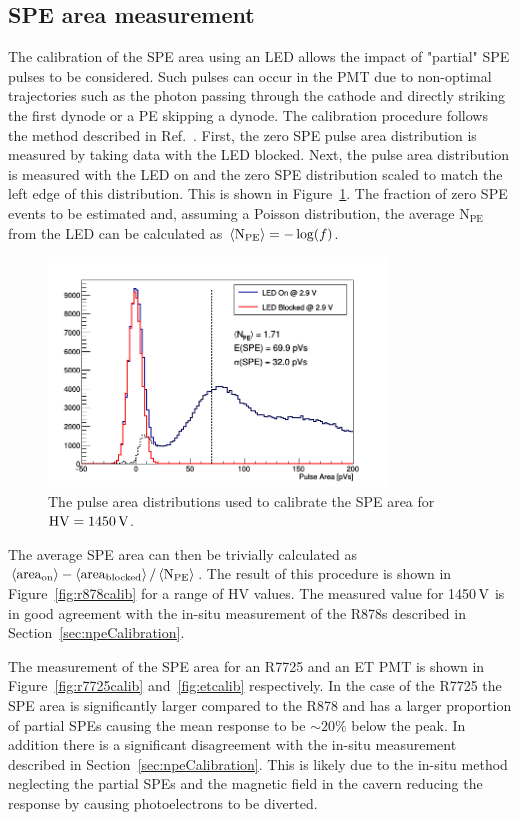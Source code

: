 \documentclass[12pt]{article}
\newcommand{\unit}[1]{\ensuremath{\text{\,#1}}\xspace}
\newcommand{\npe} {\mbox{\ensuremath{\textrm{N}_\textrm{PE}}}\xspace}
\begin{document}
\subsection{SPE area measurement}
\label{sec:ledarea}
The calibration of the SPE area using an LED allows the impact of "partial" SPE pulses to be considered.
Such pulses can occur in the PMT due to non-optimal trajectories such as the photon passing through the cathode and directly
striking the first dynode or a PE skipping a dynode. The calibration procedure follows the method described
in Ref.~\cite{Saldanha:2016mkn}. First, the zero SPE pulse area distribution is measured by taking data with the LED blocked.
Next, the pulse area distribution is measured with the LED on and the zero SPE distribution scaled to match the left edge of 
this distribution. This is shown in Figure~\ref{fig:SPEcalib}. The fraction of zero SPE events to be estimated and, assuming 
a Poisson distribution, the average \npe from the LED can be calculated as $\left< \npe \right> = -\log(f)$.

\begin{figure}[ht!]
    \centering
    \includegraphics[width=0.8\textwidth]{figures/speCalib}
    \caption{\label{fig:SPEcalib} The pulse area distributions used to calibrate the SPE area for
    $\text{HV}=1450\unit{V}$.}
\end{figure}

The average SPE area can then be trivially calculated as 
$\left<\text{area}_\text{on}\right>-\left<\text{area}_\text{blocked}\right>/\left<\npe\right>$.
The result of this procedure is shown in Figure~\ref{fig:r878calib} for a range of HV values. 
The measured value for 1450\unit{V} is in good agreement with the 
in-situ measurement of the R878s described in Section~\ref{sec:npeCalibration}.

The measurement of the SPE area for an R7725 and an ET PMT 
is shown in Figure~\ref{fig:r7725calib} and~\ref{fig:etcalib} respectively.
In the case of the R7725 the SPE area is significantly larger compared to the R878 and
has a larger proportion of partial SPEs causing the mean response to be $\sim 20\%$ below the peak.
In addition there is a significant disagreement with the in-situ measurement described 
in Section~\ref{sec:npeCalibration}. This is likely due to the in-situ method 
neglecting the partial SPEs and the magnetic field in the cavern reducing the response 
by causing photoelectrons to be diverted.
\end{document}

